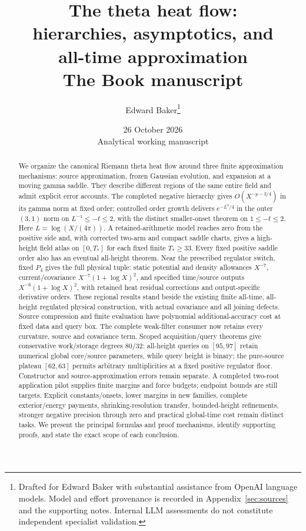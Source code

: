 \documentclass[11pt]{article}
\title{The theta heat flow:\\hierarchies, asymptotics, and\\all-time approximation\\[.7em]\large The Book manuscript}
\author{Edward Baker\thanks{Drafted for Edward Baker with substantial assistance from OpenAI language models. Model and effort provenance is recorded in Appendix~\ref{sec:sources} and the supporting notes. Internal LLM assessments do not constitute independent specialist validation.}}
\date{26 October 2026\\[.25em]\small Analytical working manuscript}
\theoremstyle{definition}\newtheorem{definition}[theorem]{Definition}
\theoremstyle{remark}\newtheorem{remark}[theorem]{Remark}
\numberwithin{equation}{section}
\begin{document}
\maketitle
\begin{abstract}
We organize the canonical Riemann theta heat flow around three finite
approximation mechanisms: source approximation, frozen Gaussian evolution,
and expansion at a moving gamma saddle. They describe different regions
of the same entire field and admit explicit error accounts. The completed
negative hierarchy gives $O(X^{-p-3/4})$ in its gamma norm at fixed order;
controlled order growth delivers $e^{-L^2/4}$ in the outer $(3,1)$ norm
on $L^{-1}\le -t\le2$, with the distinct smaller-onset theorem on
$1\le -t\le2$. Here $L=\log(X/(4\pi))$. A retained-arithmetic model
reaches zero from the positive side and, with corrected two-arm and
compact saddle charts, gives a high-height field atlas on $[0,T_*]$
for each fixed finite $T_*\ge33$. Every fixed positive saddle order
also has an eventual all-height theorem. Near the prescribed regulator
switch, fixed $P_4$ gives the full physical tuple: static potential and
density allowances $X^{-7}$, current/covariance $X^{-7}(1+\log X)^2$,
and specified time/source outputs $X^{-6}(1+\log X)^2$, with retained
heat residual corrections and output-specific derivative orders.
These regional results stand beside the existing finite all-time,
all-height regulated physical construction, with actual covariance and
all joining defects. Source compression and finite evaluation have
polynomial additional-accuracy cost at fixed data and query box.
The complete weak-filter consumer now retains every curvature, source
and covariance term. Scoped acquisition/query theorems give conservative
work/storage degrees $80/32$: all-height queries on $[95,97]$ retain
numerical global core/source parameters, while query height is binary;
the pure-source plateau $[62,63]$ permits arbitrary multiplicities at a
fixed positive regulator floor. Constructor and source-approximation
errors remain separate. A completed two-root application pilot supplies
finite margins and force budgets; endpoint bounds are still targets.
Explicit constants/onsets, lower margins in new families, complete
exterior/energy payments, shrinking-resolution transfer, bounded-height
refinements, stronger negative precision through zero and practical
global-time cost remain distinct tasks. We present the
principal formulas and proof mechanisms, identify supporting proofs, and
state the exact scope of each conclusion.
\end{abstract}
\clearpage
{\footnotesize\setlength{\baselineskip}{10pt}\tableofcontents}
\clearpage
\end{document}
